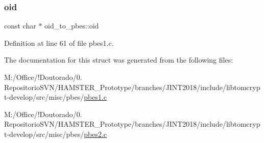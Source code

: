 \subsubsection{\texorpdfstring{oid}{oid}}
{\footnotesize\ttfamily const char $\ast$ oid\+\_\+to\+\_\+pbes\+::oid}



Definition at line 61 of file pbes1.\+c.



The documentation for this struct was generated from the following files\+:\begin{DoxyCompactItemize}
\item 
M\+:/\+Office/!\+Doutorado/0. Repositorio\+S\+V\+N/\+H\+A\+M\+S\+T\+E\+R\+\_\+\+Prototype/branches/\+J\+I\+N\+T2018/include/libtomcrypt-\/develop/src/misc/pbes/\mbox{\hyperlink{pbes1_8c}{pbes1.\+c}}\item 
M\+:/\+Office/!\+Doutorado/0. Repositorio\+S\+V\+N/\+H\+A\+M\+S\+T\+E\+R\+\_\+\+Prototype/branches/\+J\+I\+N\+T2018/include/libtomcrypt-\/develop/src/misc/pbes/\mbox{\hyperlink{pbes2_8c}{pbes2.\+c}}\end{DoxyCompactItemize}
